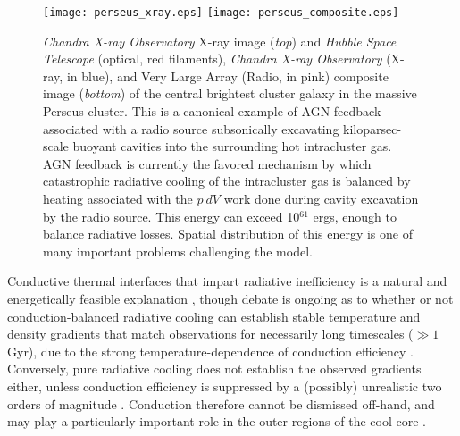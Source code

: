 \begin{figure}
\begin{center}
\texttt{[image: perseus\_xray.eps]}
\texttt{[image: perseus\_composite.eps]}
\end{center}
\caption[AGN feedback in the Perseus cluster]{{\it Chandra X-ray Observatory} X-ray image ({\it top}) and {\it Hubble Space Telescope} (optical, red filaments), {\it Chandra X-ray Observatory} (X-ray, in blue), and Very Large Array (Radio, in pink) composite image ({\it bottom}) of the central brightest cluster galaxy in the massive Perseus cluster. This is a canonical example of AGN feedback associated with a radio source subsonically excavating kiloparsec-scale buoyant cavities into the surrounding hot intracluster gas. 
AGN feedback is currently the favored mechanism by which catastrophic radiative cooling of the intracluster gas is balanced by heating associated with the $p~dV$ work done during 
cavity excavation by the radio source. This energy can exceed 10$^{61}$ ergs, enough to balance radiative losses. Spatial distribution of this energy is one of many important problems challenging the model.}
\label{fig:intro_fabian}
\end{figure}






Conductive thermal interfaces that  impart radiative inefficiency is a
natural       and       energetically       feasible       explanation
\citep{bertschinger86,bregman88,sparks89, sparks92},  though debate is
ongoing as to whether or not conduction-balanced radiative cooling can
establish  stable   temperature  and  density   gradients  that  match
observations for necessarily long  timescales ($\gg1$ Gyr), due to the
strong     temperature-dependence     of     conduction     efficiency
\citep{spitzer62,cowie77,fabian94,soker03,voit05}.   Conversely,  pure
radiative cooling  does not  establish the observed  gradients either,
unless conduction efficiency is suppressed by a (possibly) unrealistic
two                 orders                 of                magnitude
\citep{bregman88,malyshkin01,narayan01}.  Conduction  therefore cannot
be dismissed off-hand,  and may play a particularly  important role in
the       outer       regions       of       the       cool       core
\citep{sparks89,sparks92,ruszkowski02,brighenti03,sparks09}.




